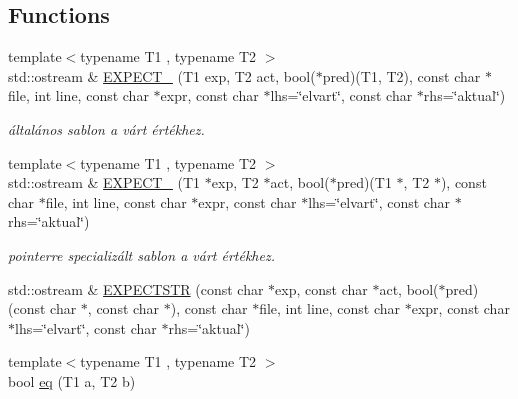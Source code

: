 \subsection*{Functions}
\begin{DoxyCompactItemize}
\item 
\mbox{\label{namespacegtest__lite_a73d2ede1d983327aea4fdd5b1d2709ce}} 
{\footnotesize template$<$typename T1 , typename T2 $>$ }\\std\+::ostream \& \mbox{\hyperlink{namespacegtest__lite_a73d2ede1d983327aea4fdd5b1d2709ce}{E\+X\+P\+E\+C\+T\+\_\+}} (T1 exp, T2 act, bool($\ast$pred)(T1, T2), const char $\ast$file, int line, const char $\ast$expr, const char $\ast$lhs=\char`\"{}elvart\char`\"{}, const char $\ast$rhs=\char`\"{}aktual\char`\"{})
\begin{DoxyCompactList}\small\item\em általános sablon a várt értékhez. \end{DoxyCompactList}\item 
\mbox{\label{namespacegtest__lite_a835d542f226b31cf5cd28033303aa7d7}} 
{\footnotesize template$<$typename T1 , typename T2 $>$ }\\std\+::ostream \& \mbox{\hyperlink{namespacegtest__lite_a835d542f226b31cf5cd28033303aa7d7}{E\+X\+P\+E\+C\+T\+\_\+}} (T1 $\ast$exp, T2 $\ast$act, bool($\ast$pred)(T1 $\ast$, T2 $\ast$), const char $\ast$file, int line, const char $\ast$expr, const char $\ast$lhs=\char`\"{}elvart\char`\"{}, const char $\ast$rhs=\char`\"{}aktual\char`\"{})
\begin{DoxyCompactList}\small\item\em pointerre specializált sablon a várt értékhez. \end{DoxyCompactList}\item 
std\+::ostream \& \mbox{\hyperlink{namespacegtest__lite_aea477921e4c26d2a2806bc3011066270}{E\+X\+P\+E\+C\+T\+S\+TR}} (const char $\ast$exp, const char $\ast$act, bool($\ast$pred)(const char $\ast$, const char $\ast$), const char $\ast$file, int line, const char $\ast$expr, const char $\ast$lhs=\char`\"{}elvart\char`\"{}, const char $\ast$rhs=\char`\"{}aktual\char`\"{})
\item 
{\footnotesize template$<$typename T1 , typename T2 $>$ }\\bool \mbox{\hyperlink{namespacegtest__lite_a884f0c7c25d80d78a73c759a8fc43a3d}{eq}} (T1 a, T2 b)
\item 

\end{DoxyCompactItemize}
